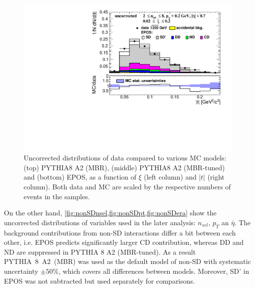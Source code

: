 \begin{figure}[h!]
	\hfill
	\includegraphics[width=.49\textwidth,page=1]{chapters/chrgSTAR/img/nonSD/SDT_epos_xi0_RP_starsim_t.pdf}
	\caption[Uncorrected distributions of data compared to various MC models: PYTHIA8 A2 (MBR), PYTHIA8 A2 (MBR-tuned) and  EPOS, as a function of $\xi$ and $|t|$.]{Uncorrected distributions of data compared to various MC models: (top) PYTHIA8 A2 (MBR), (middle) PYTHIA8 A2 (MBR-tuned) and (bottom) EPOS, as a function of $\xi$ (left column) and $|t|$ (right column). Both data and MC are scaled by the respective numbers of events in the samples.}
	\label{fig:nonSDxit}
\end{figure}
\FloatBarrier
On the other hand, \cref{fig:nonSDnsel,fig:nonSDpt,fig:nonSDera} show the uncorrected distributions of variables used in the later analysis: $n_{sel}$, $p_T$ an $\bar{\eta}$. The background contributions from non-SD interactions differ a bit between each other, i.e. EPOS predicts significantly larger CD contribution, whereas DD and ND are suppressed in PYTHIA 8 A2 (MBR-tuned).  As a result PYTHIA~8~A2~(MBR) was used as the default model  of non-SD with systematic uncertainty $\pm50\%$, which covers all differences between models. Moreover, SD' in EPOS was not subtracted but used separately for comparisons.
\captionsetup{format=plain,indention=0pt,justification=justified}
